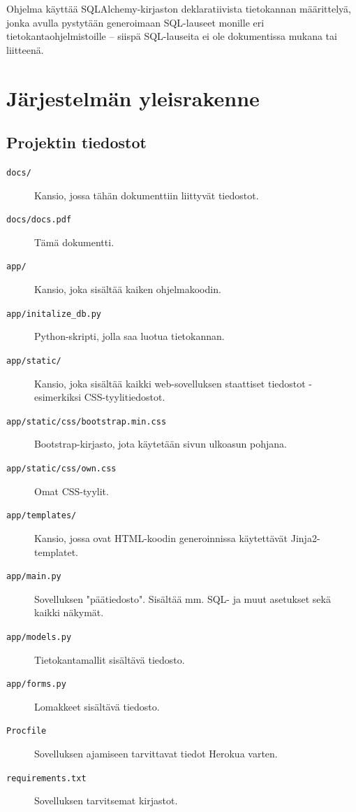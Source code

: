 \documentclass{article}
\let\stdsection\section
\renewcommand\section{\newpage\stdsection}
\begin{document}
Ohjelma käyttää SQLAlchemy-kirjaston deklaratiivista tietokannan määrittelyä, jonka avulla pystytään generoimaan SQL-lauseet monille eri tietokantaohjelmistoille -- siispä SQL-lauseita ei ole dokumentissa mukana tai liitteenä.

\section{Järjestelmän yleisrakenne}

\subsection{Projektin tiedostot}

\begin{description}
\item[\texttt{docs/}] Kansio, jossa tähän dokumenttiin liittyvät tiedostot.
\item[\texttt{docs/docs.pdf}] Tämä dokumentti.
\item[\texttt{app/}] Kansio, joka sisältää kaiken ohjelmakoodin.
\item[\texttt{app/initalize\_db.py}] Python-skripti, jolla saa luotua tietokannan.
\item[\texttt{app/static/}] Kansio, joka sisältää kaikki web-sovelluksen staattiset tiedostot - esimerkiksi CSS-tyylitiedostot.
\item[\texttt{app/static/css/bootstrap.min.css}] Bootstrap-kirjasto, jota käytetään sivun ulkoasun pohjana.
\item[\texttt{app/static/css/own.css}] Omat CSS-tyylit.
\item[\texttt{app/templates/}] Kansio, jossa ovat HTML-koodin generoinnissa käytettävät Jinja2-templatet.
\item[\texttt{app/main.py}] Sovelluksen "päätiedosto". Sisältää mm. SQL- ja muut asetukset sekä kaikki näkymät.
\item[\texttt{app/models.py}] Tietokantamallit sisältävä tiedosto.
\item[\texttt{app/forms.py}] Lomakkeet sisältävä tiedosto.
\item[\texttt{Procfile}] Sovelluksen ajamiseen tarvittavat tiedot Herokua varten.
\item[\texttt{requirements.txt}] Sovelluksen tarvitsemat kirjastot.
\end{description}
\end{document}
